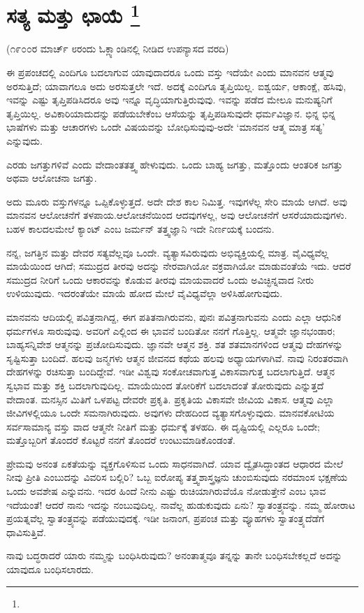 
\chapter[ಸತ್ಯ ಮತ್ತು ಛಾಯೆ ]{ಸತ್ಯ ಮತ್ತು ಛಾಯೆ \protect\footnote{}}

\centerline{(೧೯೦೦ರ ಮಾರ್ಚ್​ ೮ರಂದು ಓಕ್ಲ್ಯಾಂಡಿನಲ್ಲಿ ನೀಡಿದ ಉಪನ್ಯಾಸದ ವರದಿ)}

ಈ ಪ್ರಪಂಚದಲ್ಲಿ ಎಂದಿಗೂ ಬದಲಾಗುವ ಯಾವುದಾದರೂ ಒಂದು ವಸ್ತು ಇದೆಯೇ ಎಂದು ಮಾನವನ ಆತ್ಮವು ಅರಸುತ್ತಿದೆ; ಯಾವಾಗಲೂ ಅದು ಅರಸುತ್ತಲೇ ಇದೆ. ಅದಕ್ಕೆ ಎಂದಿಗೂ ತೃಪ್ತಿಯಿಲ್ಲ. ಐಶ್ವರ್ಯ, ಆಕಾಂಕ್ಷೆ, ಹಸಿವು, ಇವನ್ನು ಎಷ್ಟು ತೃಪ್ತಿಪಡಿಸಿದರೂ ಅವು ಇನ್ನೂ ವೃದ್ಧಿಯಾಗುತ್ತಿರುವುವು. ಇವನ್ನು ಪಡೆದ ಮೇಲೂ ಮನುಷ್ಯನಿಗೆ ತೃಪ್ತಿಯಿಲ್ಲ. ಅವಿಕಾರಿಯಾದುದನ್ನು ಪಡೆಯಬೇಕೆಂಬ ಆಸೆಯನ್ನು ತೃಪ್ತಿಪಡಿಸುವುದೇ ಧರ್ಮವಿಜ್ಞಾನ. ಭಿನ್ನ ಭಿನ್ನ ಭಾಷೆಗಳು ಮತ್ತು ಆಚಾರಗಳು ಒಂದೇ ವಿಷಯವನ್ನು ಬೋಧಿಸುವುವು-ಅದೇ ‘ಮಾನವನ ಆತ್ಮ ಮಾತ್ರ ಸತ್ಯ’ ಎನ್ನುವುದು.

ಎರಡು ಜಗತ್ತುಗಳಿವೆ ಎಂದು ವೇದಾಂತತತ್ತ್ವ ಹೇಳುವುದು. ಒಂದು ಬಾಹ್ಯ ಜಗತ್ತು, ಮತ್ತೊಂದು ಆಂತರಿಕ ಜಗತ್ತು ಅಥವಾ ಆಲೋಚನಾ ಜಗತ್ತು.

ಅದು ಮೂರು ವಸ್ತುಗಳನ್ನೂ ಒಪ್ಪಿಕೊಳ್ಳುತ್ತದೆ. ಅದೇ ದೇಶ ಕಾಲ ನಿಮಿತ್ತ. ಇವುಗಳೆಲ್ಲ ಸೇರಿ ಮಾಯೆ ಆಗಿದೆ. ಅವು ಮಾನವನ ಆಲೋಚನೆಗೆ ತಳಪಾಯ.ಆಲೋಚನೆಯಿಂದ ಆದವುಗಳಲ್ಲ, ಅವು ಆಲೋಚನೆಗೆ ಆಸರೆಯಾದುವುಗಳು. ಬಹಳ ಕಾಲದಲಮೇಲೆ ಕ್ಯಾಂಟ್​ ಎಂಬ ಜರ್ಮನ್​ ತತ್ತ್ವಜ್ಞಾನಿ ಇದೇ ನಿರ್ಣಯಕ್ಕೆ ಬಂದನು.

ನನ್ನ, ಜಗತ್ತಿನ ಮತ್ತು ದೇವರ ಸತ್ಯವೆಲ್ಲವೂ ಒಂದೇ. ವ್ಯತ್ಯಾಸವಿರುವುದು ಅಭಿವ್ಯಕ್ತಿಯಲ್ಲಿ ಮಾತ್ರ. ವೈವಿಧ್ಯವೆಲ್ಲ ಮಾಯೆಯಿಂದ ಆಗಿದೆ; ಸಮುದ್ರದ ತೀರವು ಅದನ್ನು ನೇರವಾಗಿಯೋ ವಕ್ರವಾಗಿಯೋ ಮಾಡುವಂತೆಯೆ ಇದು. ಆದರೆ ಸಮುದ್ರದ ನೀರಿಗೆ ಒಂದು ಆಕಾರವನ್ನು ಕೊಡುವ ತೀರವು ಮಾಯವಾದರೆ ಒಂದು ಅವಿಚ್ಛಿನ್ನವಾದ ನೀರು ಉಳಿಯುವುದು. ಇದರಂತೆಯೇ ಮಾಯೆ ಹೋದ ಮೇಲೆ ವೈವಿಧ್ಯವೆಲ್ಲಾ ಅಳಿಸಿಹೋಗುವುದು.

ಮಾನವನು ಆದಿಯಲ್ಲಿ ಪವಿತ್ರನಾಗಿದ್ದ, ಈಗ ಪತಿತನಾಗಿರುವನು, ಪುನಃ ಪವಿತ್ರನಾಗುವನು ಎಂದು ಎಲ್ಲಾ ಆಧುನಿಕ ಧರ್ಮಗಳೂ ಸಾರುವುವು. ಅವರಿಗೆ ಎಲ್ಲಿಂದ ಈ ಭಾವನೆ ಬಂದಿತೋ ನನಗೆ ಗೊತ್ತಿಲ್ಲ. ಆತ್ಮವೇ ಜ್ಞಾನಭಂಡಾರ; ಬಾಹ್ಯಸನ್ನಿವೇಶ ಆತ್ಮನನ್ನು ಪ್ರಚೋದಿಸುವುದು. ಜ್ಞಾನವೇ ಆತ್ಮನ ಶಕ್ತಿ. ಶತ ಶತಮಾನಗಳಿಂದ ಆತ್ಮವು ದೇಹಗಳನ್ನು ಸೃಷ್ಟಿಸುತ್ತಾ ಬಂದಿದೆ. ಹಲವು ಜನ್ಮಗಳು ಆತ್ಮನ ಜೀವನದ ಕಥೆಯ ಹಲವು ಅಧ್ಯಾಯಗಳಾಗಿವೆ. ನಾವು ನಿರಂತರವಾಗಿ ದೇಹಗಳನ್ನು ರಚಿಸುತ್ತಾ ಬಂದಿದ್ದೇವೆ. ಇಡೀ ವಿಶ್ವವು ಸಂಕೋಚವಾಗುತ್ತ ವಿಕಾಸವಾಗುತ್ತ ಬದಲಾಗುತ್ತಿದೆ. ಆತ್ಮನ ಸ್ವಭಾವ ಮತ್ತು ಶಕ್ತಿ ಬದಲಾಗುವುದಿಲ್ಲ. ಮಾಯೆಯಿಂದ ತೋರಿಕೆಗೆ ಬದಲಾದಂತೆ ತೋರುವುದು ಎನ್ನುತ್ತದೆ ವೇದಾಂತ. ಮನಸ್ಸಿನ ಮಿತಿಗೆ ಒಳಪಟ್ಟ ದೇವರೇ ಪ್ರಕೃತಿ. ಪ್ರಕೃತಿಯ ವಿಕಾಸವೇ ಜೀವಿಯ ವಿಕಾಸ. ಆತ್ಮವು ಎಲ್ಲಾ ಜೀವಿಗಳಲ್ಲಿಯೂ ಒಂದೇ ಸಮನಾಗಿರುವುದು. ಅವುಗಳು ದೇಹದಿಂದ ವ್ಯತ್ಯಾಸಗೊಳ್ಳುವುದು. ಮಾನವಕೋಟಿಯ ಸರ್ವಸಾಮಾನ್ಯ ವಸ್ತು ವಾದ ಆತ್ಮನೇ ನೀತಿಗೆ ಮತ್ತು ಧರ್ಮಕ್ಕೆ ತಳಹದಿ. ಈ ದೃಷ್ಟಿಯಲ್ಲಿ ಎಲ್ಲರೂ ಒಂದೇ; ಮತ್ತೊಬ್ಬರಿಗೆ ತೊಂದರೆ ಕೊಟ್ಟರೆ ನನಗೆ ತೊಂದರೆ ಉಂಟುಮಾಡಿಕೊಂಡಂತೆ.

ಪ್ರೇಮವು ಅನಂತ ಏಕತೆಯನ್ನು ವ್ಯಕ್ತಗೊಳಿಸುವ ಒಂದು ಸಾಧನವಾಗಿದೆ. ಯಾವ ದ್ವೈತಸಿದ್ಧಾಂತದ ಆಧಾರದ ಮೇಲೆ ನೀವು ಪ್ರೀತಿ ಎಂಬುದನ್ನು ವಿವರಿಸ ಬಲ್ಲಿರಿ? ಒಬ್ಬ ಐರೋಪ್ಯ ತತ್ತ್ವಶಾಸ್ತ್ರಜ್ಞನು ಚುಂಬಿಸುವುದು ನರಮಾಂಸ ಭಕ್ಷಣೆಯ ಒಂದು ಅವಶೇಷ ಎನ್ನುವನು. ಇದರ ಹಿಂದೆ ನೀನು ಎಷ್ಟು ರುಚಿಯಾಗಿರುವೆಯೊ ನೋಡುತ್ತೇನೆ ಎಂಬ ಭಾವ ಇದೆಯಂತೆ! ಆದರೆ ನಾನು ಇದನ್ನು ನಂಬುವುದಿಲ್ಲ. ನಾವೆಲ್ಲ ಹುಡುಕುವುದು ಏನು? ಸ್ವಾತಂತ್ರ್ಯವನ್ನು. ನಮ್ಮ ಹೋರಾಟ ಪ್ರಯತ್ನವೆಲ್ಲ ಸ್ವಾತಂತ್ರ್ಯವನ್ನು ಪಡೆಯುವುದಕ್ಕೆ. ಇಡೀ ಜನಾಂಗ, ಪ್ರಪಂಚ ಮತ್ತು ವ್ಯೂಹಗಳು ಸ್ವಾತಂತ್ರ್ಯದೆಡೆಗೆ ಧಾವಿಸುತ್ತಿವೆ.

ನಾವು ಬದ್ಧರಾದರೆ ಯಾರು ನಮ್ಮನ್ನು ಬಂಧಿಸಿರುವುದು? ಅನಂತಾತ್ಮವೂ ತನ್ನನ್ನು ತಾನೇ ಬಂಧಿಸಬೇಕಲ್ಲದೆ ಅದನ್ನು ಯಾವುದೂ ಬಂಧಿಸಲಾರದು.

